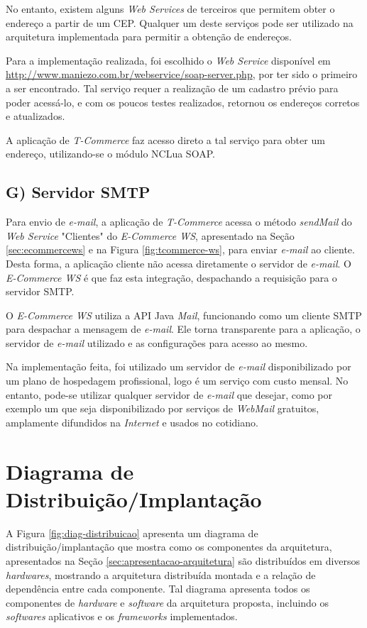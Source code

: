 No entanto, existem alguns \textit{Web Services} de terceiros
que permitem obter o endereço a partir de um CEP. Qualquer
um deste serviços pode ser utilizado na arquitetura implementada
para permitir a obtenção de endereços.

Para a implementação realizada, foi escolhido o \textit{Web Service} disponível em 
\url{http://www.maniezo.com.br/webservice/soap-server.php}, por ter sido o primeiro
a ser encontrado. Tal serviço requer a realização de um cadastro prévio 
para poder acessá-lo, e com os poucos testes realizados, retornou os endereços
corretos e atualizados.

A aplicação de \textit{T-Commerce} faz acesso direto a tal serviço para obter um endereço,
utilizando-se o módulo NCLua SOAP.

\subsection*{G) Servidor SMTP}

Para envio de \textit{e-mail}, a aplicação de \textit{T-Commerce} acessa o método \textit{sendMail} do \textit{Web Service} "Clientes" do \textit{E-Commerce WS}, apresentado na Seção \ref{sec:ecommercews} e na Figura \ref{fig:tcommerce-ws}, para 
enviar \textit{e-mail} ao cliente. Desta forma, a aplicação cliente não acessa diretamente
o servidor de \textit{e-mail}. O \textit{E-Commerce WS} é que faz esta integração, despachando
a requisição para o servidor SMTP.

O \textit{E-Commerce WS} utiliza a API Java \textit{Mail}, funcionando como um cliente SMTP para
despachar a mensagem de \textit{e-mail}. Ele torna transparente para a aplicação, o servidor
de \textit{e-mail} utilizado e as configurações para acesso ao mesmo.

Na implementação feita, foi utilizado um servidor de \textit{e-mail} disponibilizado por um plano de hospedagem
profissional, logo é um serviço com custo mensal. No entanto, pode-se utilizar qualquer servidor de \textit{e-mail} que desejar,
como por exemplo um que seja disponibilizado por serviços de \textit{WebMail} gratuitos, amplamente
difundidos na \textit{Internet} e usados no cotidiano. 

\section{Diagrama de Distribuição/Implantação}

A Figura \ref{fig:diag-distribuicao} apresenta um diagrama de distribuição/implantação
que mostra como os componentes da arquitetura, apresentados na Seção \ref{sec:apresentacao-arquitetura} 
são distribuídos em diversos \textit{hardwares},
mostrando a arquitetura distribuída montada e a relação de dependência entre cada componente.
Tal diagrama apresenta todos os componentes de \textit{hardware} e \textit{software} da arquitetura proposta,
incluindo os \textit{softwares} aplicativos e os \textit{frameworks} implementados.

